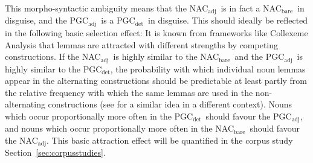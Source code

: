 \documentclass[USenglish]{article}
\newcommand{\Sub}[1]{\ensuremath{\mathrm{_{#1}}}}
\newcommand{\NACb}{NAC\Sub{bare}}
\newcommand{\NACa}{NAC\Sub{adj}}
\newcommand{\PGCd}{PGC\Sub{det}}
\newcommand{\PGCa}{PGC\Sub{adj}}
\begin{document}
This morpho-syntactic ambiguity means that the \NACa\ is in fact a \NACb\ in disguise, and the \PGCa\ is a \PGCd\ in disguise.
This should ideally be reflected in the following basic selection effect:
It is known from frameworks like Collexeme Analysis \citep{GriesStefanowitsch2004} that lemmas are attracted with different strengths by competing constructions.
If the \NACa\ is highly similar to the \NACb\ and the \PGCa\ is highly similar to the \PGCd, the probability with which individual noun lemmas appear in the alternating constructions should be predictable at least partly from the relative frequency with which the same lemmas are used in the non-alternating constructions (see \citealp[246--249]{Levshina2016} for a similar idea in a different context).
Nouns which occur proportionally more often in the \PGCd\ should favour the \PGCa, and nouns which occur proportionally more often in the \NACb\ should favour the \NACa.
This basic attraction effect will be quantified in the corpus study Section~\ref{sec:corpusstudies}.

\end{document}
